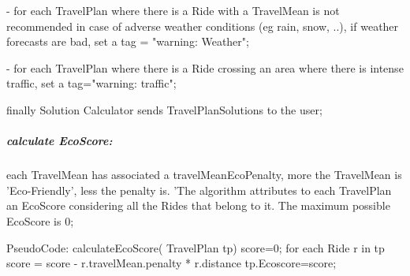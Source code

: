 	- for each TravelPlan where there is a Ride with a TravelMean is not recommended in case of adverse weather conditions (eg rain, snow, ..), if weather forecasts are bad, set a tag = "warning: Weather";\newline
	
	- for each TravelPlan where there is a Ride crossing an area where there is intense traffic, set a tag="warning: traffic"; \newline
	
	finally Solution Calculator sends TravelPlanSolutions to the user;\newline
	
	
	\subparagraph{calculate EcoScore:}	
	each TravelMean has associated a travelMeanEcoPenalty, more the TravelMean is 'Eco-Friendly', less the penalty is. 'The algorithm attributes to each TravelPlan an EcoScore considering all the Rides that belong to it.
	The maximum possible EcoScore is 0; \newline
	
	PseudoCode: \newline
	calculateEcoScore( TravelPlan tp){\newline
		score=0;\newline
		for each Ride r in tp{\newline
			score = score - r.travelMean.penalty * r.distance\newline
		}\newline
		tp.Ecoscore=score;\newline
	}\newline